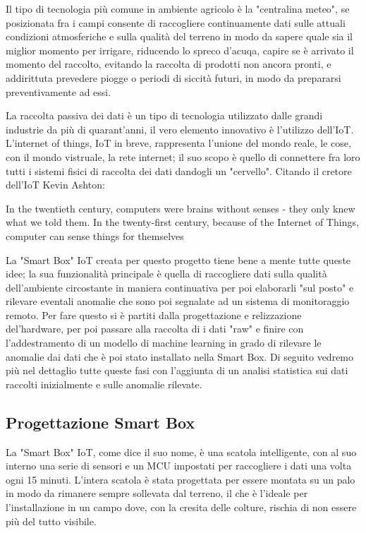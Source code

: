 \documentclass[a4paper, 12pt]{report}
\begin{document}
Il tipo di tecnologia più comune in ambiente agricolo è la "centralina meteo", se posizionata fra i campi consente di raccogliere continuamente dati sulle attuali condizioni atmosferiche e sulla qualità del terreno in modo
da sapere quale sia il miglior momento per irrigare, riducendo lo spreco d'acuqa, capire se è arrivato il momento del raccolto, evitando la raccolta di prodotti non ancora pronti, e addirittuta prevedere piogge o 
periodi di siccità futuri, in modo da prepararsi preventivamente ad essi.

La raccolta passiva dei dati è un tipo di tecnologia utilizzato dalle grandi industrie da più di quarant'anni, il vero elemento innovativo è l'utilizzo dell'IoT. L'internet of things, IoT in breve, rappresenta l'unione del
mondo reale, le cose, con il mondo vistruale, la rete internet; il suo scopo è quello di connettere fra loro tutti i sistemi fisici di raccolta dei dati dandogli un "cervello". Citando il cretore dell'IoT Kevin Ashton: 

\begin{displayquote}
  In the twentieth century, computers were brains without senses - they only knew what we told them. In the twenty-first century, because of the Internet of Things, computer can sense things for themselves
\end{displayquote}

La "Smart Box" IoT creata per questo progetto tiene bene a mente tutte queste idee; la sua funzionalità principale è quella di raccogliere dati sulla qualità dell'ambiente circostante in maniera continuativa per poi 
elaborarli "sul posto" e rilevare eventali anomalie che sono poi segnalate ad un sistema di monitoraggio remoto. Per fare questo si è partiti dalla progettazione e relizzazione del'hardware, per poi passare alla raccolta
di i dati "raw" e finire con l'addestramento di un modello di machine learning in grado di rilevare le anomalie dai dati che è poi stato installato nella Smart Box.
Di seguito vedremo più nel dettaglio tutte queste fasi con l'aggiunta di un analisi statistica sui dati raccolti inizialmente e sulle anomalie rilevate.

\subsection*{Progettazione Smart Box}
\vspace{0.5cm}

La "Smart Box" IoT, come dice il suo nome, è una scatola intelligente, con al suo interno una serie di sensori e un MCU impostati per raccogliere i dati una volta ogni 15 minuti. L'intera scatola è stata progettata 
per essere montata su un palo in modo da rimanere sempre sollevata dal terreno, il che è l'ideale per l'installazione in un campo dove, con la cresita delle colture, rischia di non essere più del tutto visibile.
\end{document}
